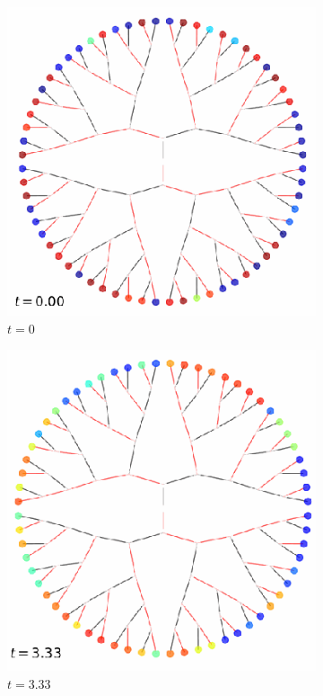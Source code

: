 \begin{figure}
	\begin{subfigure}{.5\textwidth}
		\centering
		\includegraphics[width=.8\linewidth]{img/solutions/random_0}
		\caption{$t=0$}
		\label{fig:sfig1}
	\end{subfigure}%
	\begin{subfigure}{.5\textwidth}
		\centering
		\includegraphics[width=.8\linewidth]{img/solutions/random_1}
		\caption{$t=3.33$}
		\label{fig:sfig1}
	\end{subfigure}
	\begin{subfigure}{.5\textwidth}

\end{subfigure}
\end{figure}
